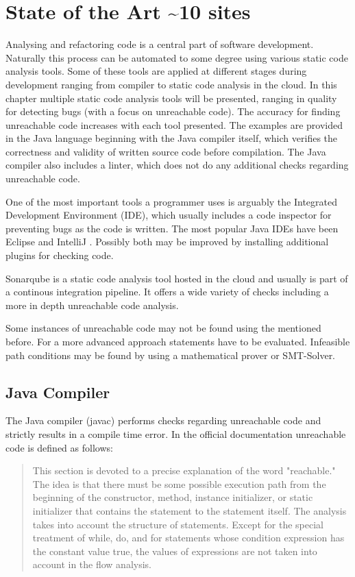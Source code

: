 
\chapter{State of the Art \textasciitilde 10 sites}
\label{cha:state of the art}

Analysing and refactoring code is a central part of software development. Naturally this process can be automated to some degree using various static code analysis tools. 
Some of these tools are applied at different stages during development ranging from compiler to static code analysis in the cloud.
In this chapter multiple static code analysis tools will be presented, ranging in quality for detecting bugs (with a focus on unreachable code).
The accuracy for finding unreachable code increases with each tool presented. 
The examples are provided in the Java language beginning with the Java compiler itself, which verifies the correctness and validity of written source code before compilation. 
The Java compiler also includes a linter, which does not do any additional checks regarding unreachable code. 


One of the most important tools a programmer uses is arguably the Integrated Development Environment (IDE), which usually includes a code inspector for preventing bugs as the code is written. 
The most popular Java IDEs have been Eclipse \cite{incCommunityOpenInnovation} and IntelliJ \cite{IntelliJIDEACapable}. 
Possibly both may be improved by installing additional plugins for checking code.


Sonarqube \cite{sonarqube} is a static code analysis tool hosted in the cloud and usually is part of a continous integration pipeline. It offers a wide variety of checks including a more in depth unreachable code analysis.


Some instances of unreachable code may not be found using the mentioned before. For a more advanced approach statements have to be evaluated. Infeasible path conditions may be found by using a mathematical prover or SMT-Solver.

\section{Java Compiler}
\label{sec:Java compiler}

The Java compiler (javac) performs checks regarding unreachable code and strictly results in a compile time error. 
In the official documentation \cite{Chapter14Blocks} unreachable code is defined as follows:
\begin{quote}
\label{quote:Java unreachable definition}
This section is devoted to a precise explanation of the word "reachable." 
The idea is that there must be some possible execution path from the beginning of the constructor, method, instance initializer, or static initializer that contains the statement to the statement itself. The analysis takes into account the structure of statements. Except for the special treatment of while, do, and for statements whose condition expression has the constant value true, the values of expressions are not taken into account in the flow analysis.
\end{quote}

